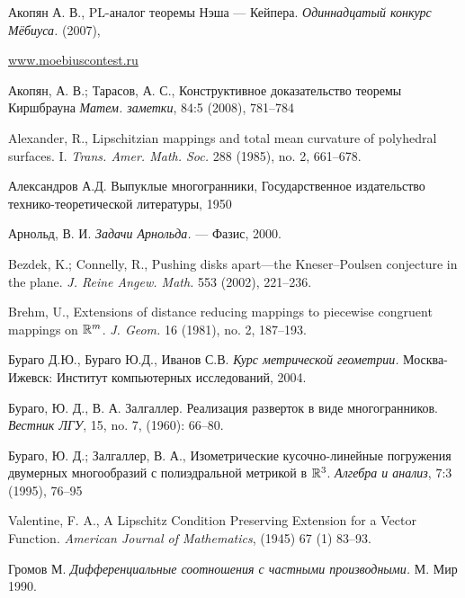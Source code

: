 \begin{thebibliography}{52}


\begin{otherlanguage}{russian}
Акопян А. В.,
PL-аналог теоремы Нэша --- Кейпера.
\textit{Одиннадцатый конкурс Мёбиуса.} (2007),
\end{otherlanguage}
\href{http://www.moebiuscontest.ru/files/2007/akopyan.pdf}{www.moebiuscontest.ru}

Акопян, А. В.;   
Тарасов, А. С.,
Конструктивное доказательство теоремы Киршбрауна
\textit{Матем. заметки}, 84:5 (2008),  781--784


Alexander, R., 
Lipschitzian mappings and total mean curvature of polyhedral surfaces. I.
\textit{Trans. Amer. Math. Soc.} 288 (1985), no. 2, 661--678.

 Александров А.Д. 
Выпуклые многогранники, 
Государственное издательство технико-теоретической литературы, 1950


Арнольд, В. И. \textit{Задачи Арнольда.} — Фазис, 2000.

Bezdek, K.;  
Connelly, R., 
Pushing disks apart---the Kneser--Poulsen conjecture in the plane.  
\textit{J. Reine Angew. Math.}  553  (2002), 221--236.

 Brehm, U., 
Extensions of distance reducing mappings to piecewise congruent mappings on $\mathbb{R}^m$.  
\textit{J. Geom.}  16  (1981), no. 2, 187--193.

Бураго Д.Ю., 
Бураго Ю.Д., 
Иванов С.В. 
\textit{Курс метрической геометрии.}
Москва-Ижевск: Институт компьютерных исследований, 2004. 

Бураго, Ю. Д., 
В. А. Залгаллер. Реализация разверток в виде многогранников. \textit{Вестник ЛГУ}, 15, no. 7, (1960): 66--80.

Бураго, Ю. Д.;  
Залгаллер, В. А.,
Изометрические кусочно-линейные погружения двумерных многообразий с полиэдральной метрикой в $\mathbb{R}^3$.
\textit{Алгебра и анализ}, 7:3 (1995),  76--95

 Valentine, F. A.,  
A Lipschitz Condition Preserving Extension for a Vector Function. \textit{American Journal of Mathematics}, (1945) 67 (1) 83--93.

  Громов М. \textit{Дифференциальные соотношения с частными производными.} М. Мир 1990.


\end{thebibliography}
